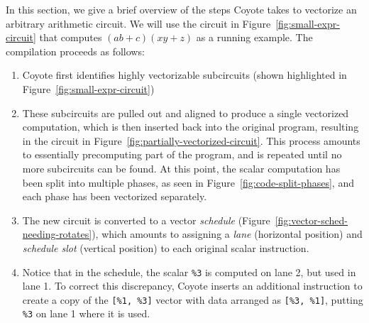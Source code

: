 In this section, we give a brief overview of the steps Coyote takes to vectorize an arbitrary arithmetic circuit.
We will use the circuit in Figure~\ref{fig:small-expr-circuit} that computes $(ab+c)(xy+z)$ as a running example.
The compilation proceeds as follows:
\begin{enumerate}
    \item Coyote first identifies highly vectorizable subcircuits (shown highlighted in Figure~\ref{fig:small-expr-circuit})
    \item These subcircuits are pulled out and aligned to produce a single vectorized computation, which is then inserted back into the original program, resulting in the circuit in Figure~\ref{fig:partially-vectorized-circuit}. 
    This process amounts to essentially precomputing part of the program, and is repeated until no more subcircuits can be found. 
    At this point, the scalar computation has been split into multiple phases, as seen in Figure~\ref{fig:code-split-phases}, and each phase has been vectorized separately.
    \item The new circuit is converted to a vector {\em schedule} (Figure~\ref{fig:vector-sched-needing-rotates}), which amounts to assigning a {\em lane} (horizontal position) and {\em schedule slot} (vertical position) to each original scalar instruction.
    \item Notice that in the schedule, the scalar \texttt{\%3} is computed on lane 2, but used in lane 1. To correct this discrepancy, Coyote inserts an additional instruction to create a copy of the \texttt{[\%1, \%3]} vector with data arranged as \texttt{[\%3, \%1]}, putting \texttt{\%3} on lane 1 where it is used.
\end{enumerate}



